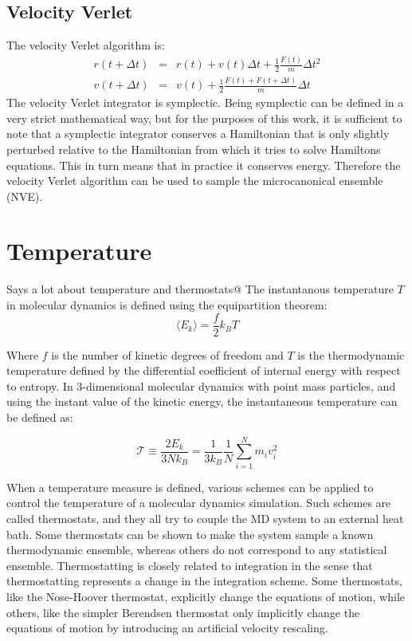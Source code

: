 \subsection{Velocity Verlet}
The velocity Verlet algorithm is:
\begin{align}
	r(t+\Delta t) &=& r(t) + v(t)\Delta t + \frac{1}{2}\frac{F(t)}{m}\Delta t^2 \\
	v(t + \Delta t) &=& v(t) + \frac{1}{2} \frac{F(t) + F(t+\Delta t)}{m}\Delta t
\end{align}
The velocity Verlet integrator is symplectic. Being symplectic can be defined in a very strict mathematical way, but for the purposes of this work, it is sufficient to note that a symplectic integrator conserves a Hamiltonian that is only slightly perturbed relative to the Hamiltonian from which it tries to solve Hamiltons equations. This in turn means that in practice it conserves energy. Therefore the velocity Verlet algorithm can be used to sample the microcanonical ensemble (NVE).

\section{Temperature}
\citet{Hunenberger2005} Says a lot about temperature and thermostats@
The instantanous temperature $T$ in molecular dynamics is defined using the equipartition theorem:
\begin{equation}
	\langle E_k \rangle = \frac{f}{2}k_B T
\end{equation}

Where $f$ is the number of kinetic degrees of freedom and $T$ is the thermodynamic temperature defined by the differential coefficient of internal energy with respect to entropy. In 3-dimensional molecular dynamics with point mass particles, and using the instant value of the kinetic energy, the instantaneous temperature can be defined as:

\begin{equation}
	\mathcal{T} \equiv \frac{2E_k}{3 Nk_B} = \frac{1}{3 k_B} \frac{1}{N}\sum_{i=1}^{N} m_iv_i^2
\end{equation}

When a temperature measure is defined, various schemes can be applied to control the temperature of a molecular dynamics simulation. Such schemes are called thermostats, and they all try to couple the MD system to an external heat bath. Some thermostats can be shown to make the system sample a known thermodynamic ensemble, whereas others do not correspond to any statistical ensemble. Thermostatting is closely related to integration in the sense that thermostatting represents a change in the integration scheme. Some thermostats, like the Nose-Hoover thermostat, explicitly change the equations of motion, while others, like the simpler Berendsen thermostat only implicitly change the equations of motion by introducing an artificial velocity rescaling. 

